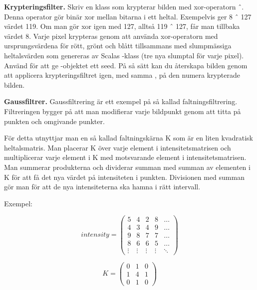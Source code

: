 \Task \textbf{Krypteringsfilter.} Skriv en klass  som krypterar bilden med xor-operatorn ˆ. Denna operator gör binär xor mellan bitarna i ett heltal. Exempelvis ger 8 ˆ 127 värdet 119. Om man gör xor igen med 127, alltså 119 ˆ 127, får man tillbaka värdet 8. Varje pixel krypteras genom att använda xor-operatorn med ursprungsvärdena för rött, grönt och blått tillsammans med slumpmässiga heltalsvärden som genereras av Scalas -klass (tre nya slumptal för varje pixel). Använd  för att ge -objektet ett seed. På så sätt kan du återskapa bilden genom att applicera krypteringsfiltret igen, med samma , på den numera krypterade bilden.

\Task \textbf{Gaussfiltrer.} Gaussfiltrering är ett exempel på så kallad faltningsfiltrering. Filtreringen bygger på att man modifierar varje bildpunkt genom att titta på punkten och omgivande punkter.

För detta utnyttjar man en så kallad faltningskärna K som är en liten kvadratisk heltalsmatris. Man placerar K över varje element i intensitetsmatrisen och multiplicerar varje element i K med motsvarande element i intensitetsmatrisen. Man summerar produkterna och dividerar summan med summan av elementen i K för att få det nya värdet på intensiteten i punkten. Divisionen med summan gör man för att de nya intensiteterna ska hamna i rätt intervall.

Exempel:

\begin{minipage}{5cm}
\begin{displaymath}
\mathit{intensity} = \left(
\begin{array}{ccccc}
5 & 4 & 2 & 8 & \ldots \\
4 & 3 & 4 & 9 & \ldots \\
9 & 8 & 7 & 7 & \ldots \\
8 & 6 & 6 & 5 & \ldots \\
\vdots & \vdots & \vdots & \vdots & \ddots
\end{array}
\right)
\end{displaymath}
\end{minipage}\hspace{2cm}
\begin{minipage}{5cm}
\begin{displaymath}
K = \left(
\begin{array}{ccc}
0 & 1 & 0 \\
1 & 4 & 1 \\
0 & 1 & 0
\end{array}
\right)
\end{displaymath}
\end{minipage}

